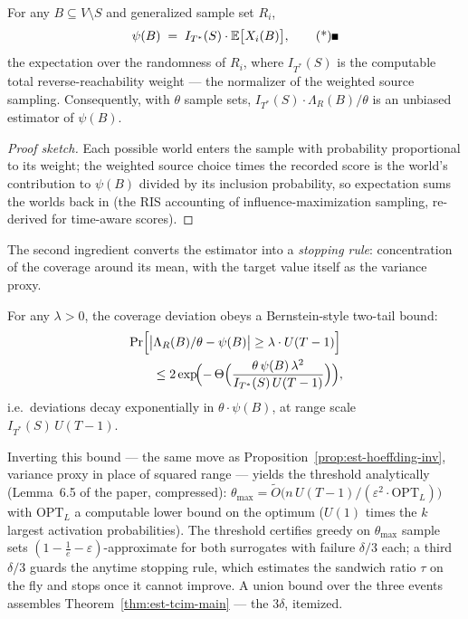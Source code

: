 \begin{lemma}
\label{lem:est-tcim-unbiased}
For any $B \subseteq V\setminus S$ and generalized sample set $R_i$,
\[
\psi(B) \;=\; I_{T^\ast}(S)\cdot \mathbb{E}\bigl[X_i(B)\bigr], \eopm
\]
the expectation over the randomness of $R_i$, where $I_{T^\ast}(S)$ is the computable total
reverse-reachability weight --- the normalizer of the weighted source sampling. Consequently,
with $\theta$ sample sets, $I_{T^\ast}(S)\cdot \Lambda_R(B)/\theta$ is an unbiased estimator of
$\psi(B)$.
\end{lemma}

\begin{proof}[Proof sketch]
Each possible world enters the sample with probability proportional to its weight; the weighted
source choice times the recorded score is the world's contribution to $\psi(B)$ divided by its
inclusion probability, so expectation sums the worlds back in (the RIS accounting of
influence-maximization sampling, re-derived for time-aware scores).
\end{proof}

The second ingredient converts the estimator into a \emph{stopping rule}: concentration of the
coverage around its mean, with the target value itself as the variance proxy.

\begin{lemma}\label{lem:est-tcim-conc}
For any $\lambda > 0$, the coverage deviation obeys a Bernstein-style two-tail bound:
\begin{align*}
&\Pr\Bigl[\bigl|\Lambda_R(B)/\theta - \psi(B)\bigr| \ge \lambda\cdot U(T-1)\Bigr]\\
&\qquad \le 2\exp\!\Bigl(-\,\Theta\Bigl(\frac{\theta\,\psi(B)\,\lambda^2}
{I_{T^\ast}(S)\,U(T-1)}\Bigr)\Bigr),
\end{align*}
i.e.\ deviations decay exponentially in $\theta\cdot\psi(B)$, at range scale
$I_{T^\ast}(S)\,U(T-1)$. \eop
\end{lemma}

Inverting this bound --- the same move as Proposition~\ref{prop:est-hoeffding-inv}, variance
proxy in place of squared range --- yields the threshold analytically (Lemma~6.5 of the paper,
compressed): $\theta_{\max} = \widetilde{O}\bigl(n\,U(T-1)/(\varepsilon^2\cdot
\mathrm{OPT}_L)\bigr)$ with $\mathrm{OPT}_L$ a computable lower bound on the optimum ($U(1)$
times the $k$ largest activation probabilities). The threshold certifies greedy on
$\theta_{\max}$ sample sets $(1-\tfrac1e-\varepsilon)$-approximate for both surrogates with
failure $\delta/3$ each; a third $\delta/3$ guards the anytime stopping rule, which
estimates the sandwich ratio $\tau$ on the fly and stops once it cannot improve.
A union bound over the three events assembles Theorem~\ref{thm:est-tcim-main} --- the $3\delta$,
itemized.

